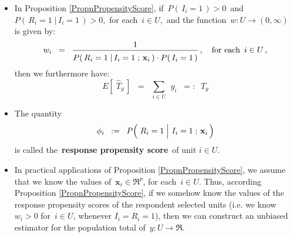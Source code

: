 \begin{remark}
\mbox{}\vskip 0.05cm
\begin{itemize}
\item
	In Proposition \ref{PropnPropensityScore},
	if \,$P(\,I_{i}=1\,) >0$\, and \,$P(\,R_{i}=1\;\vert\,I_{i}=1\,) > 0$,\,
	for each \,$i \in U$,\, and the function \,$w : U \longrightarrow (0,\infty)$\, is given by:
	\begin{equation*}
	w_{i}
	\;\; = \;\;
		\dfrac{1}{\overset{{\color{white}.}}{P}(\,R_{i}=1\;\vert\,I_{i}=1\;;\,\mathbf{x}_{i}\,)
		\cdot P(\,I_{i}=1\,)}\,,
	\quad
	\textnormal{for each \,$i \in U$}\,,
	\end{equation*}
	then we furthermore have:
	\begin{equation*}
	E\!\left[\;\widehat{T}_{y}\,\right]
	\;\; = \;\;
		\underset{i \in U}{\sum}\;\,y_{i}
	\;\; =: \;\;
		T_{y}
	\end{equation*}
\item
	The quantity
	\begin{equation*}
	\phi_{i}
	\;\; := \;\;
		P\!\left(\,\left.R_{i}\overset{{\color{white}-}}{=}1\;\right\vert\,I_{i}=1\;;\,\mathbf{x}_{i}\,\right)
	\end{equation*}
	is called the \,\textbf{response propensity score}\, of unit $i \in U$.
\item
	In practical applications of Proposition \ref{PropnPropensityScore}, we assume
	that we know the values of \,$\mathbf{x}_{i} \in \Re^{p}$, for each \,$i \in U$.
	Thus, according Proposition \ref{PropnPropensityScore}, if we somehow
	know the values of the response propensity scores of the respondent selected units
	(i.e. we know \,$w_{i} > 0$ for \,$i \in U$, whenever $I_{i} = R_{i} = 1$),
	then we can construct an unbiased estimator for the population total of
	\,$y : U \longrightarrow \Re$.	
\end{itemize}
\end{remark}


